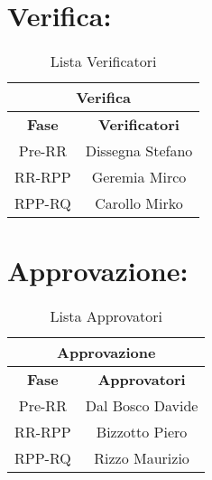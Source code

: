 \section*{\LARGE Verifica:}

\begin{table}[!h]
	\begin{center}
		\begin{tabular}
			{|c|c|}
			\hline
			\multicolumn{2}{|c|}{ \textbf{Verifica} } \\
			\hline
			\textbf{Fase} & \textbf{Verificatori} \\
			\hline
			{Pre-RR} &  Dissegna Stefano \\
			\hline
			{RR-RPP} & Geremia Mirco \\
			\hline
			{RPP-RQ} & Carollo Mirko\\
			\hline
		\end{tabular}
		\caption{Lista Verificatori} %
		\label{tabverifica}
	\end{center}
\end{table}

\newpage 
	
\section*{\LARGE Approvazione:}

\begin{table}[!h]
	\begin{center}
		\begin{tabular}
			{|c|c|}
			\hline
			\multicolumn{2}{|c|}{ \textbf{Approvazione} } \\
			\hline
			\textbf{Fase} & \textbf{Approvatori} \\
			\hline
			{Pre-RR} &  Dal Bosco Davide \\
			\hline
			{RR-RPP} & Bizzotto Piero \\
			\hline
			{RPP-RQ} & Rizzo Maurizio\\
			\hline
		\end{tabular}
		\caption{Lista Approvatori} %
		\label{tabapprovazione}
	\end{center}
\end{table}
\textbf{}

